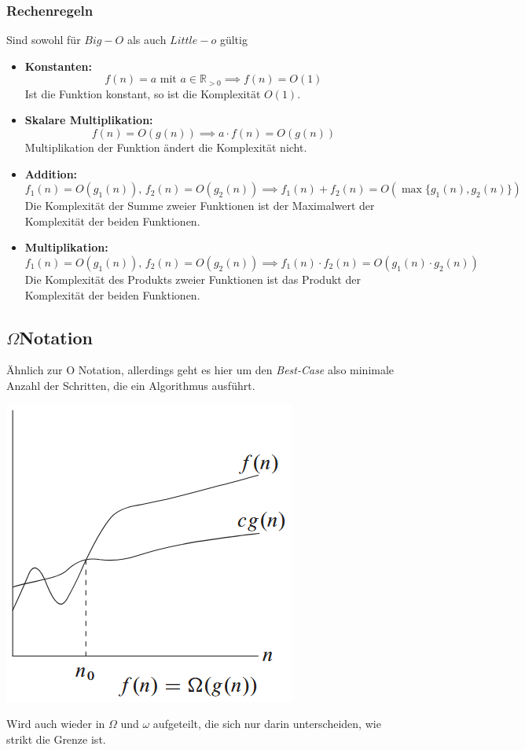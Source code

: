 \documentclass[
../../AuD-Zusammenfassung.tex,
]
{subfiles}
\begin{document}
\subsubsection{Rechenregeln}
Sind sowohl für $Big-O$ als auch $Little-o$ gültig
\begin{itemize}
    \item \textbf{Konstanten:} \\
    \[
    f(n) = a \text{ mit } a \in \mathbb{R}_{>0} \implies f(n) = O(1)
    \]
    Ist die Funktion konstant, so ist die Komplexität \(O(1)\).

    \item \textbf{Skalare Multiplikation:} \\
    \[
    f(n) = O(g(n)) \implies a \cdot f(n) = O(g(n))
    \]
    Multiplikation der Funktion ändert die Komplexität nicht.

    \item \textbf{Addition:} \\
    \[
    f_1(n) = O(g_1(n)), \, f_2(n) = O(g_2(n)) \implies f_1(n) + f_2(n) = O(\max\{g_1(n), g_2(n)\})
    \]
    Die Komplexität der Summe zweier Funktionen ist der Maximalwert der Komplexität der beiden Funktionen.

    \item \textbf{Multiplikation:} \\
    \[
    f_1(n) = O(g_1(n)), \, f_2(n) = O(g_2(n)) \implies f_1(n) \cdot f_2(n) = O(g_1(n) \cdot g_2(n))
    \]
    Die Komplexität des Produkts zweier Funktionen ist das Produkt der Komplexität der beiden Funktionen.
\end{itemize}


\newpage
\subsection{$\Omega$\space Notation}
Ähnlich zur O Notation, allerdings geht es hier um den \textit{Best-Case} also minimale Anzahl der Schritten, die ein Algorithmus ausführt.
\begin{center}
    \includegraphics[scale=0.6]{Pics/OmegaNotation.png}
\end{center}
Wird auch wieder in $\Omega$ und $\omega$ aufgeteilt, die sich nur darin unterscheiden, wie strikt die Grenze ist.
\end{document}
